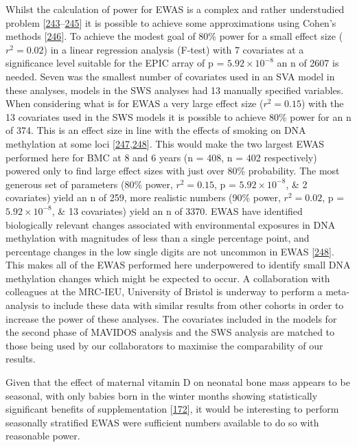 \documentclass[
]{book}
\begin{document}
Whilst the calculation of power for EWAS is a complex and rather understudied problem {[}\protect\hyperlink{ref-Wang2011}{243}--\protect\hyperlink{ref-Graw2019}{245}{]} it is possible to achieve some approximations using Cohen's methods {[}\protect\hyperlink{ref-Cohen1988}{246}{]}.
To achieve the modest goal of 80\% power for a small effect size (\(r^2 = 0.02\)) in a linear regression analysis (F-test) with 7 covariates at a significance level suitable for the EPIC array of p = \(5.92\times10^{-8}\) an n of 2607 is needed.
Seven was the smallest number of covariates used in an SVA model in these analyses, models in the SWS analyses had 13 manually specified variables.
When considering what is for EWAS a very large effect size (\(r^2 = 0.15\)) with the 13 covariates used in the SWS models it is possible to achieve 80\% power for an n of 374.
This is an effect size in line with the effects of smoking on DNA methylation at some loci {[}\protect\hyperlink{ref-Joubert2016}{247},\protect\hyperlink{ref-Breton2017}{248}{]}.
This would make the two largest EWAS performed here for BMC at 8 and 6 years (n = 408, n = 402 respectively) powered only to find large effect sizes with just over 80\% probability.
The most generous set of parameters (80\% power, \(r^2 = 0.15\), p = \(5.92\times10^{-8}\), \& 2 covariates) yield an n of 259, more realistic numbers (90\% power, \(r^2 = 0.02\), p = \(5.92\times10^{-8}\), \& 13 covariates) yield an n of 3370.
EWAS have identified biologically relevant changes associated with environmental exposures in DNA methylation with magnitudes of less than a single percentage point, and percentage changes in the low single digits are not uncommon in EWAS {[}\protect\hyperlink{ref-Breton2017}{248}{]}.
This makes all of the EWAS performed here underpowered to identify small DNA methylation changes which might be expected to occur.
A collaboration with colleagues at the MRC-IEU, University of Bristol is underway to perform a meta-analysis to include these data with similar results from other cohorts in order to increase the power of these analyses.
The covariates included in the models for the second phase of MAVIDOS analysis and the SWS analysis are matched to those being used by our collaborators to maximise the comparability of our results.

Given that the effect of maternal vitamin D on neonatal bone mass appears to be seasonal, with only babies born in the winter months showing statistically significant benefits of supplementation {[}\protect\hyperlink{ref-Cooper2016}{172}{]}, it would be interesting to perform seasonally stratified EWAS were sufficient numbers available to do so with reasonable power.
\end{document}
